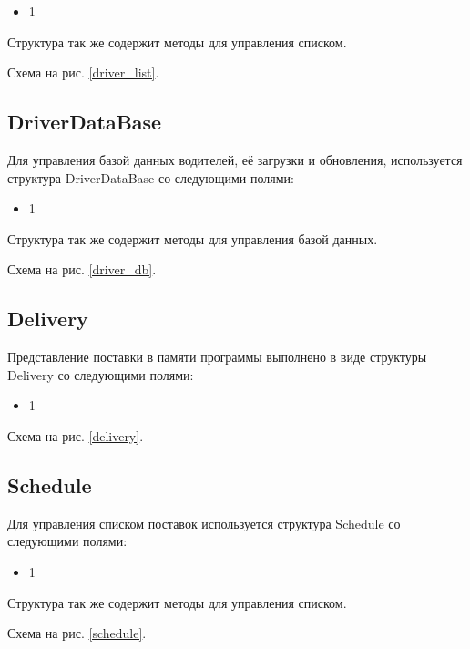 \begin{itemize}
    \item 1
\end{itemize}

Структура так же содержит методы для управления списком.

Схема на рис. \ref{driver_list}.


\subsection{DriverDataBase}

Для управления базой данных водителей, 
её загрузки и обновления, 
используется структура DriverDataBase со следующими полями: 

\begin{itemize}
    \item 1
\end{itemize}

Структура так же содержит методы для управления базой данных.

Схема на рис. \ref{driver_db}.


\subsection{Delivery}

Представление поставки в памяти программы выполнено в виде структуры Delivery со следующими полями:

\begin{itemize}
    \item 1
\end{itemize}

Схема на рис. \ref{delivery}.


\subsection{Schedule}

Для управления списком поставок используется структура Schedule со следующими полями:

\begin{itemize}
    \item 1
\end{itemize}

Структура так же содержит методы для управления списком.

Схема на рис. \ref{schedule}.


